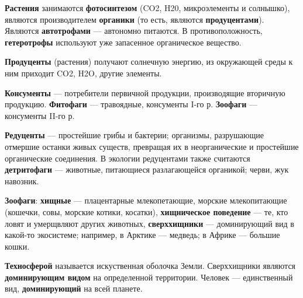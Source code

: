 \documentclass{article}
\begin{document}
\textbf{Растения} занимаются \textbf{фотосинтезом} (CO2, H20, микроэлементы и солнышко), являются производителем \textbf{органики} (то есть, являются \textbf{продуцентами}). Являются \textbf{автотрофами} — автономно питаются. В противоположность, \textbf{гетеротрофы} используют уже запасенное органическое вещество.

\textbf{Продуценты} (растения) получают солнечную энергию, из окружающей среды к ним приходит CO2, H2O, другие элементы.

\textbf{Консументы} — потребители первичной продукции, производящие вторичную продукцию. \textbf{Фитофаги} — травоядные, консументы I-го р. \textbf{Зоофаги} — консументы II-го р.

\textbf{Редуценты} — простейшие грибы и бактерии; организмы, разрушающие отмершие останки живых существ, превращая их в неорганические и простейшие органические соединения. В экологии редуцентами также считаются \textbf{детритофаги} — животные, питающиеся разлагающейся органикой; черви, жук навозник.
 
\textbf{Зоофаги}: \textbf{хищные} — плацентарные млекопетающие, морские млекопитающие (кошечки, совы, морские котики, косатки), \textbf{хищническое поведение} — те, кто ловят и умерщвляют других животных, \textbf{сверххищники} — доминирующий вид в какой-то экосистеме; например, в Арктике — медведь; в Африке — большие кошки.

\textbf{Техносферой} называется искуственная оболочка Земли. Сверххищники являются \textbf{доминирующим видом} на определенной территории. Человек — единственный вид, \textbf{доминирующий} на всей планете. 
\end{document}
